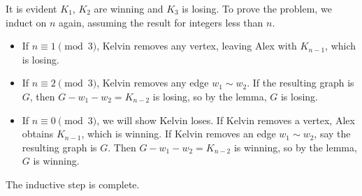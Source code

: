 It is evident $K_1$, $K_2$ are winning and $K_3$ is losing. To prove the problem, we induct on $n$ again, assuming the result for integers less than $n$.
\begin{itemize}
    \item If $n\equiv1\pmod3$, Kelvin removes any vertex, leaving Alex with $K_{n-1}$, which is losing.
    \item If $n\equiv2\pmod3$, Kelvin removes any edge $w_1\sim w_2$. If the resulting graph is $G$, then $G-w_1-w_2=K_{n-2}$ is losing, so by the lemma, $G$ is losing.
    \item If $n\equiv0\pmod3$, we will show Kelvin loses. If Kelvin removes a vertex, Alex obtains $K_{n-1}$, which is winning. If Kelvin removes an edge $w_1\sim w_2$, say the resulting graph is $G$. Then $G-w_1-w_2=K_{n-2}$ is winning, so by the lemma, $G$ is winning.
\end{itemize}
The inductive step is complete.

